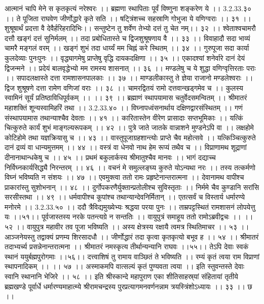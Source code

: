 आत्मानं चापि मेने स कृतकृत्यं नरेश्वरः ।।
ब्रह्मणा स्थापिताः पूर्वं विष्णुना शङ्करेण ये ।। 3.2.33.३० ।।
ते पूजिता राघवेण जीर्णोद्धारे कृते सति ।।
षट्त्रिंशच्च सहस्राणि गोभुजा ये वणिग्वराः ।। ३१ ।।
शुश्रूषार्थं प्रदत्ता वै देवैर्हरिहरादिभिः।।
सन्तुष्टेन तु शर्वेण तेभ्यो दत्तं तु चेत नम्।। ३२ ।।
श्वेताश्वचामरौ दत्तौ खङ्गं दत्तं सुनिर्मलम् ।।
तदा प्रबोधितास्ते च द्विजशुश्रूषणाय वै ।। ३३ ।।
विवाहादौ सदा भाव्यं चामरै मङ्गलं वरम् ।।
खङ्गं शुभं तदा धार्य्यं मम चिह्नं करे स्थितम् ।। ३४ ।।
गुरुपूजा सदा कार्या कुलदेव्याः पुनःपुनः ।।
वृद्ध्यागमेषु प्राप्तेषु वृद्धि दायकदक्षिणा ।। ३५ ।।
एकादश्यां शनेर्वारे दानं देयं द्विजन्मने ।।
प्रदेयं बालवृद्धेभ्यो मम रामस्य शासनात् ।। ३६ ।।
मण्डलेषु च ये शुद्धा वणिग्वृत्तिरताः पराः ।।
सपादलक्षास्ते दत्ता रामशासनपालकाः ।। ३७ ।।
माण्डलीकास्तु ते ज्ञेया राजानो मण्डलेश्वराः ।।
द्विज शुश्रूषणे दत्ता रामेण वणिजां वराः ।। ३८ ।।
चामरद्वितयं रामो दत्तवान्खड्गमेव च ।।
कुलस्य स्वामिनं सूर्यं प्रतिष्ठाविधिपूर्वकम् ।। ।। ३९ ।।
ब्रह्माणं स्थापयामास चतुर्वेदसमन्वितम् ।।
श्रीमातरं महाशक्तिं शून्यस्वामिहरिं तथा ।। 3.2.33.४० ।।
विघ्नापध्वंसनार्थाय दक्षिणद्वारसंस्थितम् ।।
गणं संस्थापयामास तथान्याश्चैव देवताः ।। ४१ ।।
कारितास्तेन वीरेण प्रासादाः सप्तभूमिकाः ।।
यत्किं चित्कुरुते कार्यं शुभं माङ्गल्यरूपकम् ।। ४२ ।।
पुत्रे जाते जातके वान्नाशने मुण्डनेऽपि वा ।।
लक्षहोमे कोटिहोमे तथा यज्ञक्रियासु च ।। ४३ ।।
वास्तुपूजाग्रहशान्त्योः प्राप्ते चैव महोत्सवे ।।
यत्किञ्चित्कुरुते दानं द्रव्यं वा धान्यमुत्तमम् ।। ४४ ।।
वस्त्रं वा धेनवो नाथ हेम रूप्यं तथैव च ।।
विप्राणामथ शूद्राणां दीनानाथान्धकेषु च ।। ४५ ।।
प्रथमं बकुलार्कस्य श्रीमातुश्चैव मानवः ।।
भागं दद्याच्च निर्विघ्नकार्यसिद्ध्यै निरन्तरम् ।। ४६ ।।
वचनं मे समुल्लङ्घ्य कुरुते योऽन्यथा नरः ।।
तस्य तत्कर्मणो विघ्नं भविष्यति न संशयः ।। ४७ ।।
एवमुक्त्वा ततो रामः प्रहृष्टेनान्तरात्मना ।।
देवानामथ वापीश्च प्राकारांस्तु सुशोभनान् ।। ४८ ।।
दुर्गोपकरणैर्युक्तान्प्रतोलीश्च सुविस्तृताः ।।
निर्ममे चैव कुण्डानि सरांसि सरसीस्तथा ।। ४९ ।।
धर्मवापीश्च कूपांश्च तथान्यान्देवनिर्मितान् ।।
एतत्सर्वं च विस्तार्य धर्मारण्ये मनोरमे ।। 3.2.33.५० ।।
ददौ त्रैविद्यमुख्येभ्यः श्रद्धया परया पुनः ।।
ताम्रपट्टस्थितं रामशासनं लोपयेत्तु यः ।।५१।।
पूर्वजास्तस्य नरके पतन्त्यग्रे न सन्ततिः ।।
वायुपुत्रं समाहूय ततो रामोऽब्रवीद्वचः ।। ।। ५२ ।।
वायुपुत्र महावीर तव पूजा भविष्यति ।।
अस्य क्षेत्रस्य रक्षायै त्वमत्र स्थितिमाचर ।। ५३ ।।
आञ्जनेयस्तु तद्वाक्यं प्रणम्य शिरसादधौ ।।
जीर्णोद्धारं तदा कृत्वा कृतकृत्यो बभूव ह ।। ५४ ।।
श्रीमातरं तदाभ्यर्च्य प्रसन्नेनान्तरात्मना ।।
श्रीमातरं नमस्कृत्य तीर्थान्यन्यानि राघवः ।।५५।।
तेऽपि देवाः स्वकं स्थानं ययुर्बह्मपुरोगमाः ।।५६।।
दत्त्वाशिषं तु रामाय वाञ्छितं ते भविष्यति ।।
रम्यं कृतं त्वया राम विप्राणां स्थापनादिकम् ।। ।। ५७ ।।
अस्माकमपि वात्सल्यं कृतं पुण्यवता त्वया ।।
इति स्तुवन्तस्ते देवाः स्वानि स्थानानि भेजिरे ।। ५८ ।।
इति श्रीस्कान्दे महापुराण एका शीतिसाहस्र्यां संहितायां तृतीये ब्रह्मखण्डे पूर्वार्धे धर्मारण्यमाहात्म्ये श्रीरामचन्द्रस्य पुरप्रत्यागमनवर्णनन्नाम त्रयस्त्रिंशोऽध्यायः ।। ३३ ।। छ ।।


